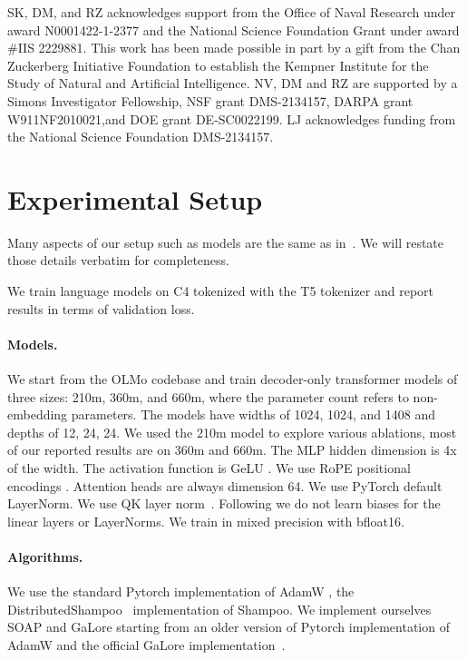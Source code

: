 \documentclass{article} %
\begin{document}
SK, DM, and RZ acknowledges support from the Office of Naval Research under award N0001422-1-2377 and the National Science Foundation Grant under award \#IIS 2229881. This work has been made possible in part by a gift from the Chan Zuckerberg Initiative Foundation to establish the
Kempner Institute for the Study of Natural and Artificial Intelligence. NV, DM and RZ are supported
by a Simons Investigator Fellowship, NSF grant DMS-2134157, DARPA grant W911NF2010021,and
DOE grant DE-SC0022199. LJ acknowledges funding from the National Science Foundation
DMS-2134157.




\appendix


\section{Experimental Setup}
\label{app:setup}




Many aspects of our setup such as models are the same as in~\citet{zhaoscience}. We will restate those details verbatim for completeness.


We train language models on C4 tokenized with the T5 tokenizer \citep{raffel2020exploring} and report results in terms of validation loss.

\paragraph{Models.} We start from the OLMo codebase \citep{groeneveld2024olmo} and train decoder-only transformer models of three sizes: 210m, 360m, and 660m, where the parameter count refers to non-embedding parameters. The models have widths of 1024, 1024, and 1408 and depths of 12, 24, 24. We used the 210m model to explore various ablations, most of our reported results are on 360m and 660m. The MLP hidden dimension is 4x of the width. The activation function is GeLU \citep{hendrycks2016gaussian}. We use RoPE positional encodings \citep{su2024roformer}. Attention heads are always dimension 64. We use PyTorch default LayerNorm. We use QK layer norm~\citep{dehghani2023scaling}. Following \citet{wortsman2024smallscale} we do not learn biases for the linear layers or LayerNorms. We train in mixed precision with bfloat16.

\paragraph{Algorithms.} We use the standard Pytorch implementation of AdamW \citep{paszke2019pytorch}, the DistributedShampoo~\cite{distributedshampoo}  implementation of Shampoo. We implement ourselves SOAP and GaLore starting from an older version of Pytorch implementation of AdamW and the official GaLore implementation~\cite{galoregithub}.
\end{document}
